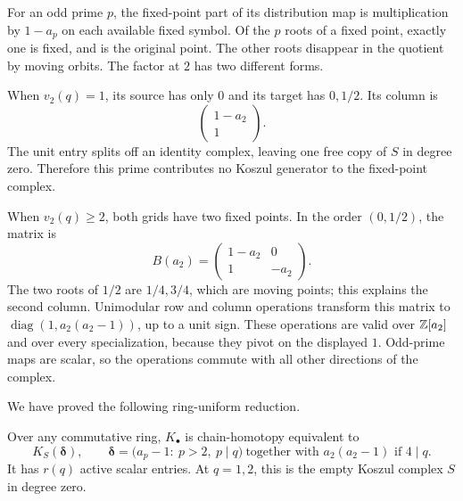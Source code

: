 For an odd prime $p$, the fixed-point part of its distribution map
is multiplication by $1-a_p$ on each available fixed symbol. Of the
$p$ roots of a fixed point, exactly one is fixed, and is the original
point. The other roots disappear in the quotient by moving orbits.
The factor at $2$ has two different forms.

When $v_2(q)=1$, its source has only $0$ and its target has $0,1/2$.
Its column is
\begin{equation}\label{ir:eq:two-column}
 \begin{pmatrix}1-a_2\\1\end{pmatrix}.
\end{equation}
The unit entry splits off an identity complex, leaving one free
copy of $S$ in degree zero. Therefore this prime contributes no
Koszul generator to the fixed-point complex.

When $v_2(q)\ge2$, both grids have two fixed points. In the order
$(0,1/2)$, the matrix is
\begin{equation}\label{ir:eq:two-matrix}
 B(a_2)=\begin{pmatrix}1-a_2&0\\1&-a_2\end{pmatrix}.
\end{equation}
The two roots of $1/2$ are $1/4,3/4$, which are moving points; this
explains the second column. Unimodular row and column operations
transform this matrix to $\operatorname{diag}(1,a_2(a_2-1))$, up to
a unit sign. These operations are valid over $\mathbb Z[a_2]$ and over
every specialization, because they pivot on the displayed $1$.
Odd-prime maps are scalar, so the operations commute with all other
directions of the complex.

We have proved the following ring-uniform reduction.
\begin{proposition}\label{ir:prop:fixed-koszul}
Over any commutative ring, $K_\bullet$ is chain-homotopy equivalent to
\begin{equation}\label{ir:eq:active-koszul}
 K_S(\boldsymbol\delta),\qquad
 \boldsymbol\delta=
 \bigl(a_p-1:\ p>2,\ p\mid q\bigr)
 \ \text{together with }a_2(a_2-1)\text{ if }4\mid q.
\end{equation}
It has $r(q)$ active scalar entries. At $q=1,2$, this is the empty
Koszul complex $S$ in degree zero.
\end{proposition}

